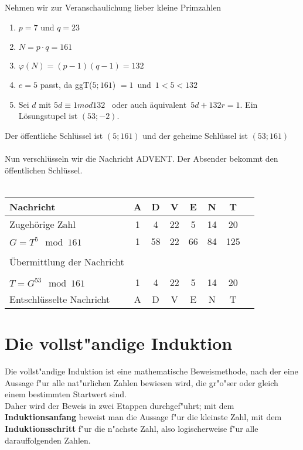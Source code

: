 \begin{Beispiel}
Nehmen wir zur Veranschaulichung lieber kleine Primzahlen
\begin{enumerate}
\item $p = 7$ und $q = 23$\\
\item $N = p \cdot q = 161$\\
\item $\varphi(N) = (p-1)(q-1) = 132$\\
\item $e = 5$ passt, da ggT($5; 161$) $ = 1$ \,und\, $1<5<132$\\
\item Sei $d$ mit $5d \equiv 1 mod 132$ \, oder auch äquivalent \,$5d + 132r = 1$. Ein Lösungstupel ist $(53;-2)$. \\
\end{enumerate}
Der öffentliche Schlüssel ist $(5;161)$ und der geheime Schlüssel ist $(53;161)$\\\\
Nun verschlüsseln wir die Nachricht \glqq ADVENT\grqq. Der Absender bekommt den öffentlichen Schlüssel.\\\\

\begin{tabular}{l*{6}{c}r}
Nachricht              & A & D & V & E & N  & T  \\
\hline
Zugehörige Zahl & 1 & 4 & 22 & 5 & 14 & 20  \\
$G = T^5 \mod 161$            & 1 & 58 & 22 & 66 &  84 & 125  \\\\
Übermittlung der Nachricht &&&&&& \\\\
$T = G^{53} \mod 161$         &  1 & 4 & 22 & 5 & 14 & 20  \\
Entschlüsselte Nachricht              & A & D & V & E & N  & T  \\
\end{tabular}
\end{Beispiel}








	\section{Die vollst"andige Induktion}

Die vollst"andige Induktion ist eine mathematische Beweismethode, nach der eine Aussage f"ur alle nat"urlichen Zahlen bewiesen wird, die gr"o"ser oder gleich einem bestimmten Startwert sind.\\
Daher wird der Beweis in zwei Etappen durchgef"uhrt; mit dem \textbf{Induktionsanfang} beweist man die Aussage f"ur die kleinste Zahl, mit dem \textbf{Induktionsschritt} f"ur die n"achste Zahl, also logischerweise f"ur alle darauffolgenden Zahlen.\\\\

